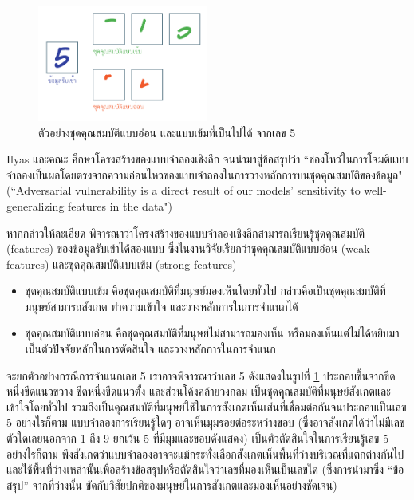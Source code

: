 \documentclass{cpereport}
\begin{document}
\begin{figure}
    \centering
    \includegraphics[width=0.5\textwidth]{images/strong-weak-features.pdf}
    \caption{ตัวอย่างชุดคุณสมบัติแบบอ่อน และแบบเข้มที่เป็นไปได้ จากเลข 5}
    \label{5-weak-strong}
\end{figure}

Ilyas และคณะ \cite{1905.02175} ศึกษาโครงสร้างของแบบจำลองเชิงลึก จนนำมาสู่ข้อสรุปว่า ``ช่องโหว่ในการโจมตีแบบจำลองเป็นผลโดยตรงจากความอ่อนไหวของแบบจำลองในการวางหลักการบนชุดคุณสมบัติของข้อมูล" (``Adversarial vulnerability is a direct result of our models’ sensitivity to well-generalizing features in the data")

หากกล่าวให้ละเอียด พิจารณาว่าโครงสร้างของแบบจำลองเชิงลึกสามารถเรียนรู้ชุดคุณสมบัติ (features) ของข้อมูลรับเข้าได้สองแบบ ซึ่งในงานวิจัยเรียกว่าชุดคุณสมบัติแบบอ่อน (weak features) และชุดคุณสมบัติแบบเข้ม (strong features)

\begin{itemize}
    \item ชุดคุณสมบัติแบบเข้ม คือชุดคุณสมบัติที่มนุษย์มองเห็นโดยทั่วไป กล่าวคือเป็นชุดคุณสมบัติที่มนุษย์สามารถสังเกต ทำความเข้าใจ และวางหลักการในการจำแนกได้
    \item ชุดคุณสมบัติแบบอ่อน คือชุดคุณสมบัติที่มนุษย์ไม่สามารถมองเห็น หรือมองเห็นแต่ไม่ได้หยิบมาเป็นตัวปัจจัยหลักในการตัดสินใจ และวางหลักการในการจำแนก
\end{itemize}

จะยกตัวอย่างกรณีการจำแนกเลข 5 เราอาจพิจารณาว่าเลข 5 ดังแสดงในรูปที่ \ref{5-weak-strong} ประกอบขึ้นจากขีดหนึ่งขีดแนวขวาง ขีดหนึ่งขีดแนวตั้ง และส่วนโค้งคล้ายวงกลม เป็นชุดคุุณสมบัติที่มนุษย์สังเกตและเข้าใจโดยทั่วไป รวมถึงเป็นคุณสมบัติที่มนุษย์ใช้ในการสังเกตเห็นเส้นที่เชื่อมต่อกันจนประกอบเป็นเลข 5 อย่างไรก็ตาม แบบจำลองการเรียนรู้ใดๆ อาจเห็นมุมรอยต่อระหว่างขอบ (ซึ่งอาจสังเกตได้ว่าไม่มีเลขตัวใดเลยนอกจาก 1 ถึง 9 ยกเว้น 5 ที่มีมุมและขอบดังแสดง) เป็นตัวตัดสินใจในการเรียนรู้เลข 5 อย่างไรก็ตาม พึงสังเกตว่าแบบจำลองอาจจะแม้กระทั่งเลือกสังเกตเห็นพื้นที่ว่างบริเวณที่แตกต่างกันไป และใช้พื้นที่ว่างเหล่านั้นเพื่อสร้างข้อสรุปหรือตัดสินใจว่าเลขที่มองเห็นเป็นเลขใด (ซึ่งการนำมาซึ่ง ``ข้อสรุป'' จากที่ว่างนั้น ขัดกับวิสัยปกติของมนุษย์ในการสังเกตและมองเห็นอย่างชัดเจน)
 

\end{document}
